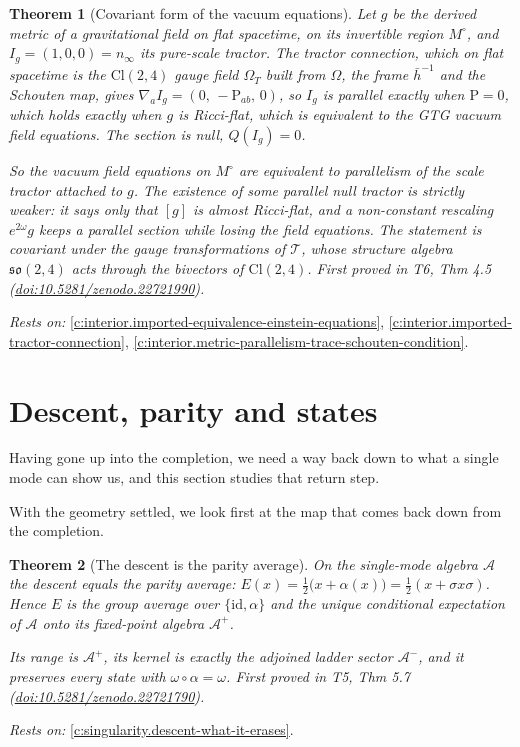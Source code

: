 \documentclass[11pt]{article}
\newtheorem{theorem}{Theorem}[section]
\theoremstyle{definition}
\theoremstyle{plain}
\providecommand{\Aa}{}\renewcommand{\Aa}{\mathcal{A}}
\providecommand{\Aev}{}\renewcommand{\Aev}{\mathcal{A}^{+}}
\providecommand{\Aod}{}\renewcommand{\Aod}{\mathcal{A}^{-}}
\providecommand{\Cl}{}\renewcommand{\Cl}{\mathrm{Cl}}
\providecommand{\Mo}{}\renewcommand{\Mo}{M^{\circ}}
\providecommand{\Sch}{}\renewcommand{\Sch}{\mathrm{P}}
\providecommand{\hb}{}\renewcommand{\hb}{\bar{h}}
\providecommand{\id}{}\renewcommand{\id}{\mathrm{id}}
\providecommand{\nInf}{}\renewcommand{\nInf}{n_\infty}
\begin{document}
\begin{theorem}[Covariant form of the vacuum equations]\label{c:interior.covariant-form-vacuum-equations}
Let $g$ be the derived metric of a gravitational field on flat spacetime, on its invertible region $\Mo$, and $I_g = (1,0,0) = \nInf$ its pure-scale tractor. The tractor connection, which on flat spacetime is the $\Cl(2,4)$ gauge field $\Omega_{T}$ built from $\Omega$, the frame $\hb^{-1}$ and the Schouten map, gives $\nabla_a I_g = (0,\, -\Sch_{ab},\, 0)$, so $I_g$ is parallel exactly when $\Sch = 0$, which holds exactly when $g$ is Ricci-flat, which is equivalent to the GTG vacuum field equations. The section is null, $Q(I_g) = 0$.

So the vacuum field equations on $\Mo$ are equivalent to parallelism of the scale tractor attached to $g$. The existence of some parallel null tractor is strictly weaker: it says only that $[g]$ is almost Ricci-flat, and a non-constant rescaling $e^{2\omega}g$ keeps a parallel section while losing the field equations. The statement is covariant under the gauge transformations of $\mathcal{T}$, whose structure algebra $\mathfrak{so}(2,4)$ acts through the bivectors of $\Cl(2,4)$.
\emph{First proved in} T6, Thm 4.5 (\href{https://doi.org/10.5281/zenodo.22721990}{doi:10.5281/zenodo.22721990}).
\end{theorem}
\noindent\emph{Rests on:} \ref{c:interior.imported-equivalence-einstein-equations}, \ref{c:interior.imported-tractor-connection}, \ref{c:interior.metric-parallelism-trace-schouten-condition}.

\section{Descent, parity and states}

Having gone up into the completion, we need a way back down to what a single mode can show us, and this section studies that return step.

With the geometry settled, we look first at the map that comes back down from the completion.

\begin{theorem}[The descent is the parity average]\label{c:singularity.descent-parity-average}
On the single-mode algebra $\Aa$ the descent equals the parity average: $E(x) = \tfrac12\bigl(x + \alpha(x)\bigr) = \tfrac12(x + \sigma x \sigma)$. Hence $E$ is the group average over $\{\id, \alpha\}$ and the unique conditional expectation of $\Aa$ onto its fixed-point algebra $\Aev$.

Its range is $\Aev$, its kernel is exactly the adjoined ladder sector $\Aod$, and it preserves every state with $\omega \circ \alpha = \omega$.
\emph{First proved in} T5, Thm 5.7 (\href{https://doi.org/10.5281/zenodo.22721790}{doi:10.5281/zenodo.22721790}).
\end{theorem}
\noindent\emph{Rests on:} \ref{c:singularity.descent-what-it-erases}.
\end{document}
